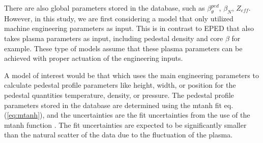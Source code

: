 \documentclass[a4paper, twoside, final, 12pt]{article}
\begin{document}
There are also global parameters stored in the database, such as $\beta_\theta^{ped}$, $\beta_N$, $Z_{eff}$. However, in this study, we are first considering a model that only utilized machine engineering parameters as input. This is in contrast to EPED that also takes plasma parameters as input, including pedestal density and core  $\beta$ for example. These type of models assume that these plasma parameters can be achieved with proper actuation of the engineering inputs. 

A model of interest would be that which uses the main engineering parameters to calculate pedestal profile parameters like height, width, or position for the pedestal quantities temperature, density, or pressure.
The pedestal profile parameters stored in the database are determined using the mtanh fit eq.\;(\ref{eq:mtanh}), and the uncertainties are the fit uncertainties from the use of the mtanh function \cite{Frassinetti_2020}.
The fit uncertainties are expected to be significantly smaller than the natural scatter of the data due to the fluctuation of the plasma.
\end{document}
